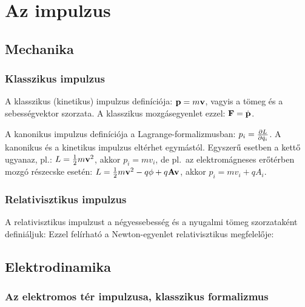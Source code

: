 \chapter{Az impulzus}

 \section{Mechanika}

  \subsection{Klasszikus impulzus}
 
   A klasszikus (kinetikus) impulzus definíciója: $\mathbf{p}=m\mathbf{v}$, vagyis a tömeg és a sebességvektor szorzata. A klasszikus mozgásegyenlet ezzel: $\mathbf{F}=\dot{\mathbf{p}}$.
   
   A kanonikus impulzus definíciója a Lagrange-formalizmusban: $p_i=\frac{\partial L}{\partial \dot{q}_i}$. A kanonikus és a kinetikus impulzus eltérhet egymástól. Egyszerű esetben a kettő ugyanaz, pl.: $L=\frac{1}{2}m\mathbf{v}^2$, akkor $p_i=mv_i$, de pl.\ az elektromágneses erőtérben mozgó részecske esetén: $L=\frac{1}{2}m\mathbf{v}^2-q\phi+q\mathbf{A}\mathbf{v}$, akkor $p_i=mv_i+qA_i$. 
   
  \subsection{Relativisztikus impulzus}
   
   A relativisztikus impulzust a négyessebesség és a nyugalmi tömeg szorzataként definiáljuk: 
   Ezzel felírható a Newton-egyenlet relativisztikus megfelelője:
   
 \section{Elektrodinamika}
  
  \subsection{Az elektromos tér impulzusa, klasszikus formalizmus}
   
